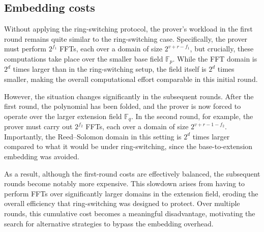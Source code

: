 \documentclass{article}
\newcommand{\Fp}{\mathbb F_p}
\newcommand{\Fq}{\mathbb F_q}
\begin{document}

\subsection{Embedding costs}

Without applying the ring-switching protocol, the prover’s workload in the first round remains quite similar to the ring-switching case. Specifically, the prover must perform $2^{f_1}$ FFTs, each over a domain of size $2^{v + r - f_1}$, but crucially, these computations take place over the smaller base field $\Fp$. While the FFT domain is $2^d$ times larger than in the ring-switching setup, the field itself is $2^d$ times smaller, making the overall computational effort comparable in this initial round.

However, the situation changes significantly in the subsequent rounds. After the first round, the polynomial has been folded, and the prover is now forced to operate over the larger extension field $\Fq$. In the second round, for example, the prover must carry out $2^{f_2}$ FFTs, each over a domain of size $2^{v + r - 1 - f_2}$. Importantly, the Reed–Solomon domain in this setting is $2^d$ times larger compared to what it would be under ring-switching, since the base-to-extension embedding was avoided.

As a result, although the first-round costs are effectively balanced, the subsequent rounds become notably more expensive. This slowdown arises from having to perform FFTs over significantly larger domains in the extension field, eroding the overall efficiency that ring-switching was designed to protect. Over multiple rounds, this cumulative cost becomes a meaningful disadvantage, motivating the search for alternative strategies to bypass the embedding overhead.


\end{document}

